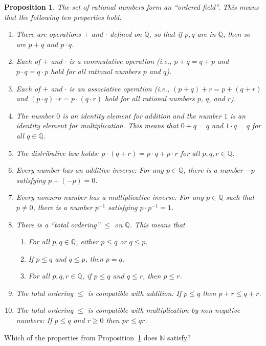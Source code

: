 \documentclass[12pt]{amsart}
\newcommand{\Q}{\mathbb{Q}}
\newcommand{\N}{\mathbb{N}}
\numberwithin{equation}{section}
\theoremstyle{plain} %
\newtheorem{prop}[equation]{Proposition}
\theoremstyle{definition}
\theoremstyle{remark}
\begin{document}
\begin{prop} \label{prop1}
  The set of rational numbers form an ``ordered field''. This means that the following ten properties hold:
\begin{enumerate}
\item There are operations $+$ and $\cdot$ defined on $\Q$, so that if $p, q$ are in $\Q$, then so are $p + q$ and $p \cdot q$.
\item Each of $+$ and $\cdot$ is a commutative operation (i.e., $p + q = q + p$ and $p \cdot q = q \cdot p$ hold for all rational numbers $p$ and $q$). 
\item Each of $+$ and $\cdot$ is an associative  operation (i.e., $(p + q) + r = p + (q + r)$ and $(p \cdot q) \cdot r = p \cdot (q \cdot r)$ hold for all rational numbers $p$,
  $q$, and $r$). 
\item The number $0$ is an identity element for addition and the number $1$ is an identity element for multiplication. This means that
 $0 + q = q$ and $1 \cdot q = q$ for all $q \in \Q$. 
\item The distributive law holds: $p \cdot (q + r) = p \cdot q + p \cdot r$ for all $p,q,r \in \Q$. 
\item Every number has an additive inverse: For any $p \in \Q$, there is a number $-p$ satisfying $p + (-p) = 0$.
\item Every nonzero number has a multiplicative inverse: For any $p \in \Q$ such that $p \ne 0$, there is a number $p^{-1}$ satisfying ${p \cdot p^{-1}= 1}$.
\item There is a ``total ordering'' $\leq$ on $\Q$. This means that 
\begin{enumerate}
\item For all $p, q \in \Q$, either $p \leq q$ or $q \leq p$.
\item If $p \leq q$ and $q \leq p$, then $p = q$.
\item For all $p, q, r \in \Q$, if $p \leq q$ and $q \leq r$, then $p \leq r$.
\end{enumerate}
\item The total ordering $\leq$ is compatible with addition: If $p \leq q$ then $p + r \leq q + r$.
\item The total ordering $\leq$ is compatible with multiplication by non-negative numbers: 
If $p \leq q$ and $r \geq 0$ then $pr \leq qr$.
\end{enumerate}
\end{prop}



Which of the properties from Proposition~\ref{prop1} does $\N$ satisfy?
\end{document}
